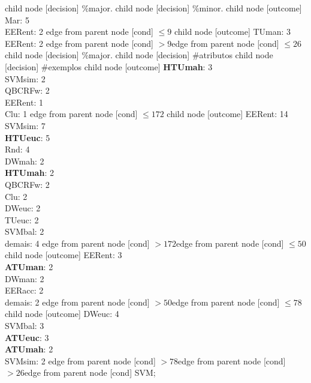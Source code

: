 child {node [decision] {\%major.}
child {node [decision] {\%minor.}
child {node [outcome] {Mar: 5\\
EERent: 2} edge from parent node [cond] {$\leq9$}}
child {node [outcome] {TUman: 3\\
EERent: 2} edge from parent node [cond] {$>9$}}edge from parent node [cond] {$\leq26$}}
child {node [decision] {\%major.}
child {node [decision] {\#atributos}
child {node [decision] {\#exemplos}
child {node [outcome] {\textbf{HTUmah}: 3\\
SVMsim: 2\\
QBCRFw: 2\\
EERent: 1\\
Clu: 1} edge from parent node [cond] {$\leq172$}}
child {node [outcome] {EERent: 14\\
SVMsim: 7\\
\textbf{HTUeuc}: 5\\
Rnd: 4\\
DWmah: 2\\
\textbf{HTUmah}: 2\\
QBCRFw: 2\\
Clu: 2\\
DWeuc: 2\\
TUeuc: 2\\
SVMbal: 2\\
demais: 4} edge from parent node [cond] {$>172$}}edge from parent node [cond] {$\leq50$}}
child {node [outcome] {EERent: 3\\
\textbf{ATUman}: 2\\
DWman: 2\\
EERacc: 2\\
demais: 2} edge from parent node [cond] {$>50$}}edge from parent node [cond] {$\leq78$}}
child {node [outcome] {DWeuc: 4\\
SVMbal: 3\\
\textbf{ATUeuc}: 3\\
\textbf{ATUmah}: 2\\
SVMsim: 2} edge from parent node [cond] {$>78$}}edge from parent node [cond] {$>26$}}edge from parent node [cond] {SVM}};